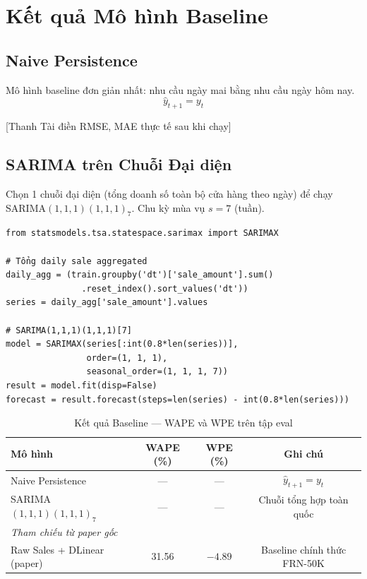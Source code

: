 \documentclass[12pt,a4paper]{report}
\begin{document}
\section{Kết quả Mô hình Baseline}

\subsection{Naive Persistence}

Mô hình baseline đơn giản nhất: nhu cầu ngày mai bằng nhu cầu ngày hôm nay.
\[
\hat{y}_{t+1} = y_t
\]

[Thanh Tài điền RMSE, MAE thực tế sau khi chạy]

\subsection{SARIMA trên Chuỗi Đại diện}

Chọn 1 chuỗi đại diện (tổng doanh số toàn bộ cửa hàng theo ngày) để chạy SARIMA$(1,1,1)(1,1,1)_7$. Chu kỳ mùa vụ $s=7$ (tuần).

\begin{lstlisting}[caption=Fit SARIMA trên chuỗi tổng hợp]
from statsmodels.tsa.statespace.sarimax import SARIMAX

# Tổng daily sale aggregated
daily_agg = (train.groupby('dt')['sale_amount'].sum()
               .reset_index().sort_values('dt'))
series = daily_agg['sale_amount'].values

# SARIMA(1,1,1)(1,1,1)[7]
model = SARIMAX(series[:int(0.8*len(series))],
                order=(1, 1, 1),
                seasonal_order=(1, 1, 1, 7))
result = model.fit(disp=False)
forecast = result.forecast(steps=len(series) - int(0.8*len(series)))
\end{lstlisting}

\begin{table}[H]
\centering
\caption{Kết quả Baseline --- WAPE và WPE trên tập eval}
\label{tab:baseline}
\begin{tabular}{lccc}
\toprule
\textbf{Mô hình} & \textbf{WAPE (\%)} & \textbf{WPE (\%)} & \textbf{Ghi chú} \\
\midrule
Naive Persistence             & --- & --- & $\hat{y}_{t+1} = y_t$ \\
SARIMA$(1,1,1)(1,1,1)_7$     & --- & --- & Chuỗi tổng hợp toàn quốc \\
\midrule
\multicolumn{4}{l}{\textit{Tham chiếu từ paper gốc}} \\
Raw Sales + DLinear (paper)   & 31.56 & $-4.89$ & Baseline chính thức FRN-50K \\
\bottomrule
\end{tabular}
\end{table}
\end{document}
